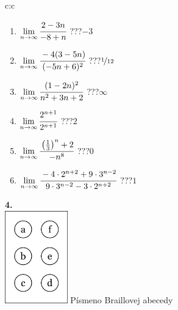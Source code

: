 \documentclass[10pt]{report}
\begin{document}
\begin{tabular}{c:c}
\begin{minipage}[c][104.5mm][t]{0.5\linewidth}
\begin{center}
\begin{minipage}{0.79\linewidth}
\begin{center}
\begin{varwidth}{\linewidth}
\begin{enumerate}
\normalsize
\item $\lim\limits_{n\to\infty}\cfrac{2-3n}{-8+n}$\quad \dotfill\; ???\;\dotfill \quad $-3$
\item $\lim\limits_{n\to\infty}\cfrac{-4(3-5n)}{(-5n+6)^2}$\quad \dotfill\; ???\;\dotfill \quad $\nicefrac{1}{12}$
\item $\lim\limits_{n\to\infty}\cfrac{(1-2n)^2}{n^2+3n+2}$\quad \dotfill\; ???\;\dotfill \quad $\infty$
\item $\lim\limits_{n\to\infty}\cfrac{2^{n+1}}{2^{n+1}}$\quad \dotfill\; ???\;\dotfill \quad $2$
\item $\lim\limits_{n\to\infty}\cfrac{\left(\frac{1}{3}\right)^n +2}{-n^{8}}$\quad \dotfill\; ???\;\dotfill \quad $0$
\item $\lim\limits_{n\to\infty}\cfrac{-4\cdot 2^{n+2}+9\cdot 3^{n-2}}{9\cdot 3^{n-2}-3\cdot 2^{n+2}}$\quad \dotfill\; ???\;\dotfill \quad $1$
\end{enumerate}
\end{varwidth}
\end{center}
\end{minipage}
\begin{minipage}{0.20\linewidth}
\begin{center}
{\Huge\bfseries 4.} \\[2mm]
\includegraphics[height=40mm]{../images/braille.png}
{\small Písmeno Braillovej abecedy}
\end{center}
\end{minipage}
\end{center}
\end{minipage}
%
\end{tabular}
\newpage
\thispagestyle{empty}
\end{document}
